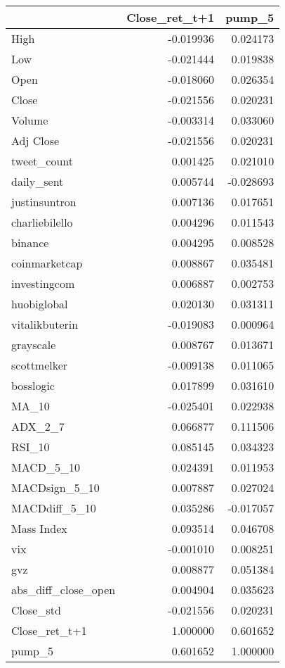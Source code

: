 \begin{tabular}{lrr}
\toprule
{} &  Close\_ret\_t+1 &    pump\_5 \\
\midrule
High                &      -0.019936 &  0.024173 \\
Low                 &      -0.021444 &  0.019838 \\
Open                &      -0.018060 &  0.026354 \\
Close               &      -0.021556 &  0.020231 \\
Volume              &      -0.003314 &  0.033060 \\
Adj Close           &      -0.021556 &  0.020231 \\
tweet\_count         &       0.001425 &  0.021010 \\
daily\_sent          &       0.005744 & -0.028693 \\
justinsuntron       &       0.007136 &  0.017651 \\
charliebilello      &       0.004296 &  0.011543 \\
binance             &       0.004295 &  0.008528 \\
coinmarketcap       &       0.008867 &  0.035481 \\
investingcom        &       0.006887 &  0.002753 \\
huobiglobal         &       0.020130 &  0.031311 \\
vitalikbuterin      &      -0.019083 &  0.000964 \\
grayscale           &       0.008767 &  0.013671 \\
scottmelker         &      -0.009138 &  0.011065 \\
bosslogic           &       0.017899 &  0.031610 \\
MA\_10               &      -0.025401 &  0.022938 \\
ADX\_2\_7             &       0.066877 &  0.111506 \\
RSI\_10              &       0.085145 &  0.034323 \\
MACD\_5\_10           &       0.024391 &  0.011953 \\
MACDsign\_5\_10       &       0.007887 &  0.027024 \\
MACDdiff\_5\_10       &       0.035286 & -0.017057 \\
Mass Index          &       0.093514 &  0.046708 \\
vix                 &      -0.001010 &  0.008251 \\
gvz                 &       0.008877 &  0.051384 \\
abs\_diff\_close\_open &       0.004904 &  0.035623 \\
Close\_std           &      -0.021556 &  0.020231 \\
Close\_ret\_t+1       &       1.000000 &  0.601652 \\
pump\_5              &       0.601652 &  1.000000 \\
\bottomrule
\end{tabular}
